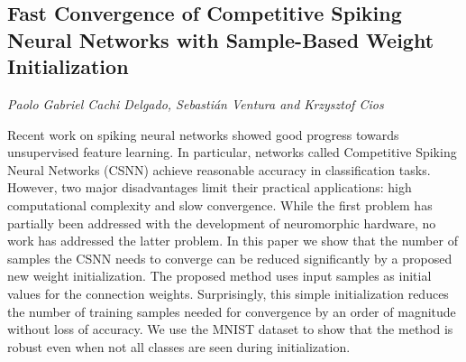\documentclass[../booklet.tex]{subfiles}
\begin{document}
\subsection[Fast Convergence of Competitive Spiking Neural Networks with Sample-Based Weight Initialization. {\it Paolo Gabriel Cachi Delgado, Sebastián Ventura and Krzysztof Cios}]{Fast Convergence of Competitive Spiking Neural Networks with Sample-Based Weight Initialization}
  

\begin{center}
  {\it Paolo Gabriel Cachi Delgado, Sebastián Ventura and Krzysztof Cios}
\end{center}

\vskip 0.8cm


Recent work on spiking neural networks showed good progress towards unsupervised feature learning. In particular, networks called Competitive Spiking Neural Networks (CSNN) achieve reasonable accuracy in classification tasks. However, two major disadvantages limit their practical applications: high computational complexity and slow convergence. While the first problem has partially been addressed with the development of neuromorphic hardware, no work has addressed the latter problem. In this paper we show that the number of samples the CSNN needs to converge can be reduced significantly by a proposed new weight initialization. The proposed method uses input samples as initial values for the connection weights. Surprisingly, this simple initialization reduces the number of training samples needed for convergence by an order of magnitude without loss of accuracy. We use the MNIST dataset to show that the method is robust even when not all classes are seen during initialization.

\end{document}
